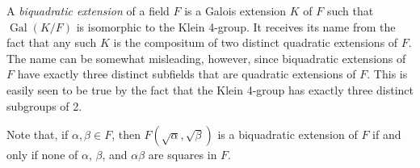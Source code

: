 \documentclass[12pt]{article}
\begin{document}
A {\sl biquadratic extension\/} of a field $F$ is a Galois extension $K$ of $F$ such that $\operatorname{Gal} (K/F)$ is isomorphic to the Klein 4-group.  It receives its name from the fact that any such $K$ is the compositum of two distinct quadratic extensions of $F$.  The name can be somewhat misleading, however, since biquadratic extensions of $F$ have exactly three distinct subfields that are quadratic extensions of $F$.  This is easily seen to be true by the fact that the Klein 4-group has exactly three distinct subgroups of  2.

Note that, if $\alpha, \beta \in F$, then $F(\sqrt{\alpha}, \sqrt{\beta})$ is a biquadratic extension of $F$ if and only if none of $\alpha$, $\beta$, and $\alpha \beta$ are squares in $F$.
\end{document}
